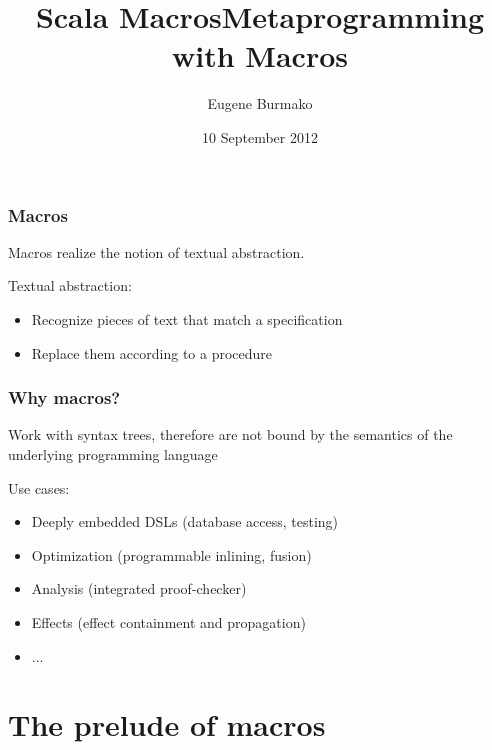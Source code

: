 \documentclass[hyperref={bookmarks=false}]{beamer}
\title{Scala Macros}
\begin{document}
\title{Metaprogramming with Macros}
\author{Eugene Burmako}
\date{10 September 2012}
{
\begin{frame}
  \titlepage
\end{frame}
}

\begin{frame}[fragile]
\frametitle{Macros}
\pause
Macros realize the notion of textual abstraction.

Textual abstraction:
\begin{itemize}
\item Recognize pieces of text that match a specification
\item Replace them according to a procedure
\end{itemize}
\end{frame}

\begin{frame}[fragile]
\frametitle{Why macros?}

Work with syntax trees, therefore are not bound by the semantics of the underlying
programming language

Use cases:
\begin{itemize}
\item Deeply embedded DSLs (database access, testing)
\item Optimization (programmable inlining, fusion)
\item Analysis (integrated proof-checker)
\item Effects (effect containment and propagation)
\item ...
\end{itemize}
\end{frame}



\section{The prelude of macros}
\end{document}
